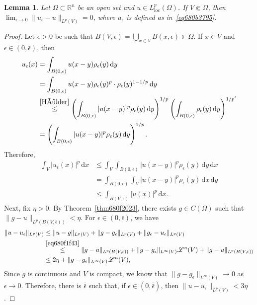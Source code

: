 \documentclass[a4paper,9pt]{amsart}
\newcommand{\scr}[1]{\mathscr{#1}}
\newcommand{\R}{\mathbb{R}}	%
\newcommand{\did}{\,\mathrm{d}}	%
\newcommand{\loc}{\mathrm{loc}}
\theoremstyle{plain}
\newtheorem{lemma}[proposition]{Lemma}
\theoremstyle{definition}
\theoremstyle{remark}
\begin{document}
\begin{lemma}\label{lem680f1ffe}
	Let $\Omega\subset\R^n$ be an open set and $u\in L^p_\loc(\Omega)$.
	If $V\Subset\Omega$, then $\lim_{\epsilon\to0}\|u_\epsilon-u\|_{L^p(V)} = 0$, 
	where $u_\epsilon$ is defined as in~\eqref{eq680b3795}.
\end{lemma}
\begin{proof}
	Let $\bar\epsilon>0$ be such that $B(V,\bar\epsilon) = \bigcup_{x\in V} B(x,\bar\epsilon) \Subset \Omega$.
	If $x\in V$ and $\epsilon\in(0,\bar\epsilon)$, then
	\begin{align*}
	 	u_\epsilon(x)
		&= \int_{B(0,\epsilon)} u(x-y) \rho_\epsilon(y) \did y \\
		&= \int_{B(0,\epsilon)} u(x-y) \rho_\epsilon(y)^p \cdot \rho_\epsilon(y)^{1-1/p} \did y \\
		&\overset{\eqref{Hölder}}\le \left(\int_{B(0,\epsilon)} |u(x-y)|^p \rho_\epsilon(y) \did y \right)^{1/p}
		\left( \int_{B(0,\epsilon)}\rho_\epsilon(y)\did y\right)^{1/p'} \\
		&= \left(\int_{B(0,\epsilon)} |u(x-y)|^p \rho_\epsilon(y) \did y \right)^{1/p} .
	\end{align*}
	Therefore, 
	\begin{align}
	 	\int_V|u_\epsilon(x)|^p \did x
		&\le \int_V \int_{B(0,\epsilon)} |u(x-y)|^p \rho_\epsilon(y) \did y\did x \\
		&= \int_{B(0,\epsilon)} \int_V |u(x-y)|^p \rho_\epsilon(y) \did x \did y \\
		&\le \int_{B(V,\epsilon)} |u(x)|^p \did x . \label{eq680f1f43}
	\end{align}
	Next, fix $\eta>0$.
	By Theorem~\ref{thm680f2023}, there exists $g\in C(\Omega)$ such that $\|g-u\|_{L^p(B(V,\bar\epsilon))} < \eta$.
	For $\epsilon\in(0,\bar\epsilon)$, we have
	\begin{align*}
		\|u-u_\epsilon\|_{L^p(V)}
		&\le \|u-g\|_{L^p(V)} + \|g-g_\epsilon\|_{L^p(V)} + \|g_\epsilon-u_\epsilon\|_{L^p(V)} \\
		&\overset{\eqref{eq680f1f43}}\le \|g-u\|_{L^p(B(V,\bar\epsilon))} + \|g-g_\epsilon\|_{L^\infty(V)} \scr L^n(V) + \|g-u\|_{L^p(B(V,\bar\epsilon))} \\
		&\le 2\eta + \|g-g_\epsilon\|_{L^\infty(V)} \scr L^n(V) ,
	\end{align*}
	Since $g$ is continuous and $V$ is compact, we know that $\|g-g_\epsilon\|_{L^\infty(V)}\to0$ as $\epsilon\to0$.
	Therefore, there is $\bar{\bar\epsilon}$ such that, if $\epsilon\in(0,\bar{\bar\epsilon})$, then $\|u-u_\epsilon\|_{L^p(V)}<3\eta$.
\end{proof}
\end{document}
